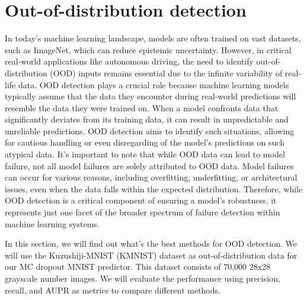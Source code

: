\section{Out-of-distribution detection}
In today's machine learning landscape, models are often trained on vast datasets, such as ImageNet, which can reduce epistemic uncertainty. However, in critical real-world applications like autonomous driving, the need to identify out-of-distribution (OOD) inputs remains essential due to the infinite variability of real-life data. OOD detection plays a crucial role because machine learning models typically assume that the data they encounter during real-world predictions will resemble the data they were trained on. When a model confronts data that significantly deviates from its training data, it can result in unpredictable and unreliable predictions. OOD detection aims to identify such situations, allowing for cautious handling or even disregarding of the model's predictions on such atypical data. It's important to note that while OOD data can lead to model failure, not all model failures are solely attributed to OOD data. Model failures can occur for various reasons, including overfitting, underfitting, or architectural issues, even when the data falls within the expected distribution. Therefore, while OOD detection is a critical component of ensuring a model's robustness, it represents just one facet of the broader spectrum of failure detection within machine learning systems.

In this section, we will find out what's the best methods for OOD detection. We will use the Kuzushiji-MNIST (KMNIST) dataset as out-of-distribution data for our MC dropout MNIST predictor. This dataset consists of 70,000 28x28 grayscale number images. We will evaluate the performance using precision, recall, and AUPR as metrics to compare different methods.

